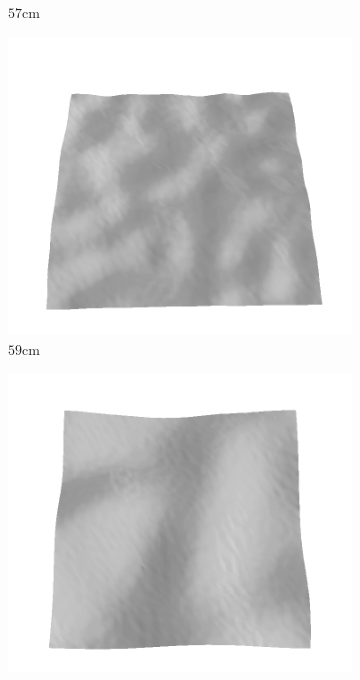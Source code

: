\documentclass[../document.tex]{subfiles}
\begin{document}
\begin{figure}[htbp]
\begin{subfigure}[b]{0.19\textwidth}
    \caption{$57$cm}
    \end{subfigure}
    \begin{subfigure}[b]{0.19\textwidth}
    \includegraphics[width=\linewidth]{../img/5/train/all/59-patch-3d-majavi-30.png}
    \caption{$59$cm}
    \end{subfigure}
    \begin{subfigure}[b]{0.19\textwidth}
    \includegraphics[width=\linewidth]{../img/5/train/all/60-patch-3d-majavi-31.png}

\end{subfigure}
\end{figure}
\end{document}
